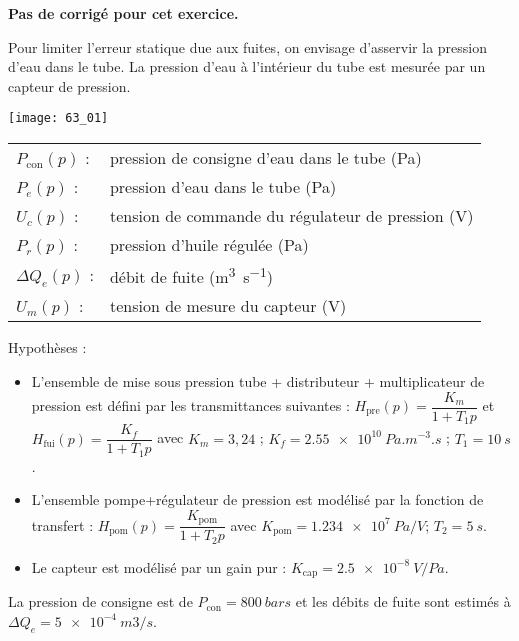 \normaltrue \difficilefalse \tdifficilefalse
\correctiontrue

\setcounter{question}{0}

\ifcorrection
\else
\textbf{Pas de corrigé pour cet exercice.}
\fi

\ifprof
\else 

Pour limiter l’erreur statique due aux fuites, on envisage d’asservir la pression d’eau dans le tube. 
La pression d’eau à l’intérieur du tube est mesurée par un capteur de pression. 

\begin{center}
\texttt{[image: 63\_01]}
\end{center}

 
 \begin{tabular}{lp{5cm}}
$P_{\text{con}}(p)$ : & 	pression de consigne d’eau dans le tube (Pa) \\
$P_e(p)$ : & 	pression d’eau dans le tube (Pa) \\
$U_c(p)$ : & 	tension de commande du régulateur de pression (V)\\
$P_r(p)$ : &	pression d’huile régulée (Pa)\\
$\Delta Q_e(p)$ :& 	débit de fuite (\si{m^3s^{-1}})\\
$U_m(p)$ 	:&	tension de mesure du capteur (V)\\
\end{tabular}
 
 Hypothèses :
\begin{itemize}
\item L’ensemble de mise sous pression {tube + distributeur + multiplicateur de pression} est défini par les transmittances suivantes : $H_{\text{pre}} (p)=\dfrac{K_m}{1+T_1 p}$	et	$H_{\text{fui}} (p)=\dfrac{K_f}{1+T_1 p}$ avec 	$K_m = 3,24$ ; 	$K_f = \SI{2,55e10}{Pa.m^{-3}.s}$ ; 	$T_1  = \SI{10}{s}$.
\item L’ensemble {pompe+régulateur de pression} est modélisé par la fonction de transfert :
$H_{\text{pom}} (p)=\dfrac{K_{\text{pom}}}{1+T_2 p}$  avec 	$K_{\text{pom}} = \SI{1,234e7}{Pa/V}$; 	$T_2 = \SI{5}{s}$.
\item Le capteur est modélisé par un gain pur :	$K_{\text{cap}} = \SI{2,5e-8}{V/Pa}$.
\end{itemize}
La pression de consigne est de $P_{\text{con}} = \SI{800}{bars}$ et les débits de fuite sont estimés à $\Delta Q_e = \SI{5e-4}{m3/s}$.

